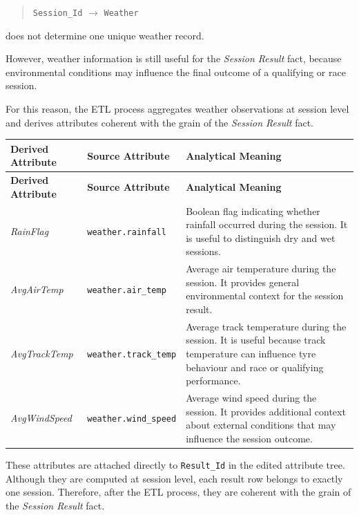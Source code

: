 \documentclass[a4paper,11pt]{article}
\begin{document}
	\begin{quote}
		\texttt{Session\_Id} $\rightarrow$ \texttt{Weather}
	\end{quote}
	
	does not determine one unique weather record.
	
	However, weather information is still useful for the \textit{Session Result} fact, because
	environmental conditions may influence the final outcome of a qualifying or race session.
	
	For this reason, the ETL process aggregates weather observations at session level and
	derives attributes coherent with the grain of the \textit{Session Result} fact.
	
	\begin{longtable}{|p{4.2cm}|p{4.2cm}|p{6.2cm}|}
		\hline
		\textbf{Derived Attribute} & \textbf{Source Attribute} & \textbf{Analytical Meaning} \\
		\hline
		\endfirsthead
		
		\hline
		\textbf{Derived Attribute} & \textbf{Source Attribute} & \textbf{Analytical Meaning} \\
		\hline
		\endhead
		
		\textit{RainFlag}
		& \texttt{weather.rainfall}
		& Boolean flag indicating whether rainfall occurred during the session. It is useful to distinguish dry and wet sessions. \\
		\hline
		
		\textit{AvgAirTemp}
		& \texttt{weather.air\_temp}
		& Average air temperature during the session. It provides general environmental context for the session result. \\
		\hline
		
		\textit{AvgTrackTemp}
		& \texttt{weather.track\_temp}
		& Average track temperature during the session. It is useful because track temperature can influence tyre behaviour and race or qualifying performance. \\
		\hline
		
		\textit{AvgWindSpeed}
		& \texttt{weather.wind\_speed}
		& Average wind speed during the session. It provides additional context about external conditions that may influence the session outcome. \\
		\hline
	\end{longtable}
	
	These attributes are attached directly to \texttt{Result\_Id} in the edited attribute tree.
	Although they are computed at session level, each result row belongs to exactly one
	session. Therefore, after the ETL process, they are coherent with the grain of the
	\textit{Session Result} fact.
	
\end{document}
